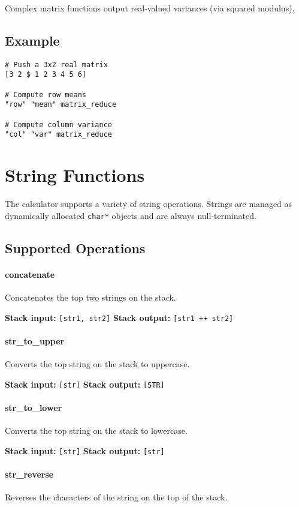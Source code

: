 \documentclass[12pt]{article}
\begin{document}
Complex matrix functions output real-valued variances (via squared modulus).

\subsection{Example}

\begin{verbatim}
# Push a 3x2 real matrix
[3 2 $ 1 2 3 4 5 6]

# Compute row means
"row" "mean" matrix_reduce

# Compute column variance
"col" "var" matrix_reduce
\end{verbatim}

\section{String Functions}

The calculator supports a variety of string operations. Strings are managed as dynamically allocated \texttt{char*} objects and are always null-terminated.

\subsection{Supported Operations}

\paragraph{concatenate}
Concatenates the top two strings on the stack.

\textbf{Stack input:} \texttt{[str1, str2]}  
\textbf{Stack output:} \texttt{[str1 \texttt{++} str2]}

\paragraph{str\_to\_upper}
Converts the top string on the stack to uppercase.

\textbf{Stack input:} \texttt{[str]}  
\textbf{Stack output:} \texttt{[STR]}

\paragraph{str\_to\_lower}
Converts the top string on the stack to lowercase.

\textbf{Stack input:} \texttt{[str]}  
\textbf{Stack output:} \texttt{[str]}

\paragraph{str\_reverse}
Reverses the characters of the string on the top of the stack.
\end{document}
